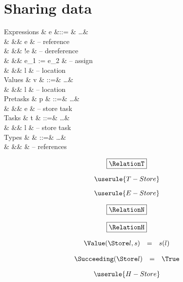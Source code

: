 
\section{Sharing data}

\statefultrue

\begin{grammar}
  Expressions
    & e    &::= & \ldots          & \\
    &      &\mid& \Ref e          & – reference \\
    &      &\mid& !e              & – dereference \\
    &      &\mid& e_1 := e_2      & – assign \\
    &      &\mid& l               & – location \\
  Values
    & v    & ::=& \ldots          & \\
    &      &\mid& l               & – location \\
  Pretasks
    & p    & ::=& \ldots          & \\
    &      &\mid& \Store e        & – store task \\
  Tasks
    & t    & ::=& \ldots          & \\
    &      &\mid& \Store l        & – store task \\
  Types
    & \tau & ::=& \ldots          & \\
    &      &\mid& \Reference \tau & – references \\
\end{grammar}

\begin{equation*}
  \boxed{\RelationT}
\end{equation*}

\begin{equation*}
  \userule{T-Store}
\end{equation*}

\begin{equation*}
  \userule{E-Store}
\end{equation*}

\begin{equation*}
  \boxed{\RelationN}
\end{equation*}

\begin{equation*}
  \boxed{\RelationH}
\end{equation*}

\begin{equation*}
  \begin{array}{lcl}
    \Value(\Store l, s) &=& s(l)
  \end{array}
\end{equation*}

\begin{equation*}
  \begin{array}{lcl}
    \Succeeding(\Store l) &=& \True
  \end{array}
\end{equation*}

\begin{equation*}
  \userule{H-Store}
\end{equation*}
